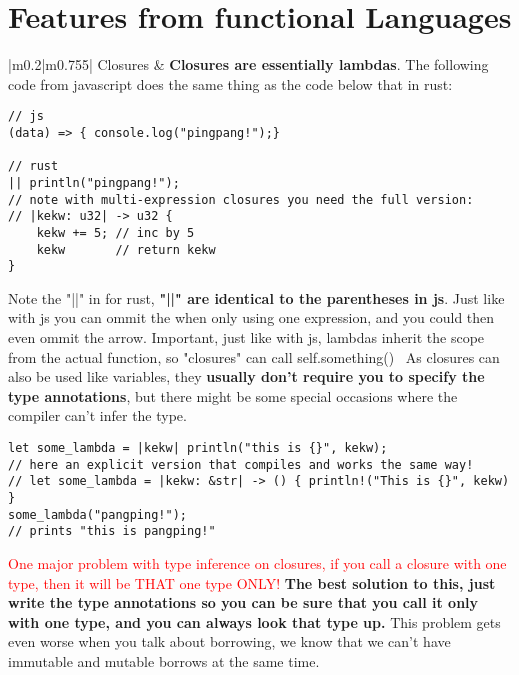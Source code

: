 \documentclass[main.tex,fontsize=8pt,paper=a4,paper=portrait,DIV=calc,]{scrartcl}
\begin{document}
\begin{table}[ht!]
\section{Features from functional Languages}
\begin{tabular}{|m{0.2\linewidth}|m{0.755\linewidth}|}
\hline
Closures & 
\textbf{Closures are essentially lambdas}. The following code from javascript does the same thing as the code below that in rust:\newline
\begin{lstlisting}
// js
(data) => { console.log("pingpang!");}

// rust
|| println("pingpang!");
// note with multi-expression closures you need the full version:
// |kekw: u32| -> u32 {
    kekw += 5; // inc by 5
    kekw       // return kekw
}
\end{lstlisting}
Note the "||" in for rust, \textbf{"||" are identical to the parentheses in js}.\newline
Just like with js you can ommit the {} when only using one expression, and you could then even ommit the arrow.\newline
\textcolor{OliveGreen}{Important, just like with js, lambdas inherit the scope from the actual function, so "closures" can call self.something()}\newline
\, \newline
As closures can also be used like variables, they \textbf{usually don't require you to specify the type annotations}, but there might be some special occasions where the compiler can't infer the type.\newline
\begin{lstlisting}
let some_lambda = |kekw| println("this is {}", kekw);
// here an explicit version that compiles and works the same way! 
// let some_lambda = |kekw: &str| -> () { println!("This is {}", kekw) }
some_lambda("pangping!");
// prints "this is pangping!"
\end{lstlisting} 
\textcolor{red}{One major problem with type inference on closures, if you call a closure with one type, then it will be THAT one type ONLY!}\newline
\textbf{The best solution to this, just write the type annotations so you can be sure that you call it only with one type, and you can always look that type up.}\newline
This problem gets even worse when you talk about borrowing, we know that we can't have immutable and mutable borrows at the same time.\newline

\end{tabular}
\end{table}
\end{document}
